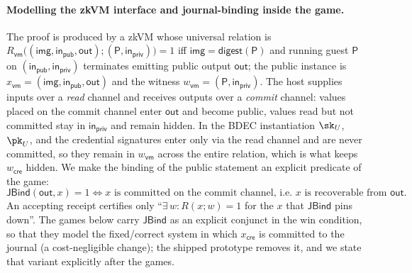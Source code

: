 \paragraph{Modelling the zkVM interface and journal-binding inside the game.}
The proof is produced by a zkVM whose universal relation is
$R_{\mathsf{vm}}\bigl((\mathsf{img},\mathsf{in}_{\mathsf{pub}},\mathsf{out});(\mathsf{P},\mathsf{in}_{\mathsf{priv}})\bigr)=1$
iff $\mathsf{img}=\mathsf{digest}(\mathsf{P})$ and running guest $\mathsf{P}$ on
$(\mathsf{in}_{\mathsf{pub}},\mathsf{in}_{\mathsf{priv}})$ terminates emitting public output $\mathsf{out}$;
the public instance is $x_{\mathsf{vm}}=(\mathsf{img},\mathsf{in}_{\mathsf{pub}},\mathsf{out})$ and the
witness $w_{\mathsf{vm}}=(\mathsf{P},\mathsf{in}_{\mathsf{priv}})$. The host supplies inputs over a
\emph{read} channel and receives outputs over a \emph{commit} channel: values placed on the commit
channel enter $\mathsf{out}$ and become public, values read but not committed stay in
$\mathsf{in}_{\mathsf{priv}}$ and remain hidden. In the BDEC instantiation $\sk_U$, $\pk_U$, and the
credential signatures enter only via the read channel and are never committed, so they remain in
$w_{\mathsf{vm}}$ across the entire relation, which is what keeps $w_{\mathsf{cre}}$ hidden. We make
the binding of the public statement an explicit predicate of the game:
\[
  \mathsf{JBind}(\mathsf{out},x)=1
  \iff
  \text{$x$ is committed on the commit channel, i.e.\ $x$ is recoverable from $\mathsf{out}$.}
\]
An accepting receipt certifies only ``$\exists\,w:R(x;w)=1$ for the $x$ that $\mathsf{JBind}$ pins
down''. The games below carry $\mathsf{JBind}$ as an explicit conjunct in the win condition, so that
they model the fixed/correct system in which $x_{\mathsf{cre}}$ is committed to the journal (a
cost-negligible change); the shipped prototype removes it, and we state that variant explicitly after
the games.

